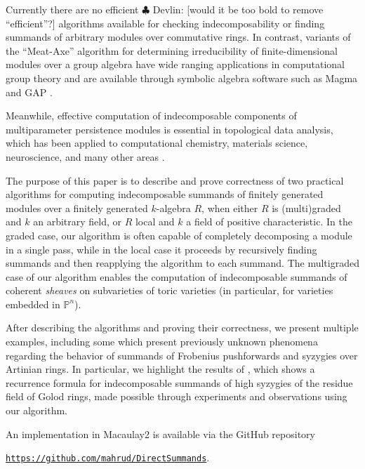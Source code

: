 \documentclass[12pt]{article}
\def\PP{\mathbb P}
\theoremstyle{theorem}
\numberwithin{thm}{section}
\theoremstyle{definition}
\newcommand{\devlin}[1]{{\color{red} \sf $\clubsuit$ Devlin: [#1]}}
\begin{document}
Currently there are no efficient \devlin{would it be too bold to remove ``efficient''?} algorithms available for checking indecomposability or finding summands of arbitrary modules over commutative rings. In contrast, variants of the ``Meat-Axe'' algorithm for determining irreducibility of finite-dimensional modules over a group algebra have wide ranging applications in computational group theory \cite{Parker84,HR94,Holt98} and are available through symbolic algebra software such as Magma and GAP \cite{MAGMA,GAP}.

Meanwhile, effective computation of indecomposable components of multiparameter persistence modules is essential in topological data analysis, which has been applied to computational chemistry, materials science, neuroscience, and many other areas \cite{BL23}.

The purpose of this paper is to describe and prove correctness of two practical algorithms for computing indecomposable summands of finitely generated modules over a finitely generated $k$-algebra $R$, when either $R$ is (multi)graded and $k$ an arbitrary field, or $R$ local and $k$ a field of positive characteristic.
In the graded case, our algorithm is often capable of completely decomposing a module in a single pass, while in the local case it proceeds by recursively finding summands and then reapplying the algorithm to each summand.
The multigraded case of our algorithm enables the computation of indecomposable summands of coherent \emph{sheaves} on subvarieties of toric varieties (in particular, for varieties embedded in $\PP^n$).

After describing the algorithms and proving their correctness, we present multiple examples, including some which present previously unknown phenomena regarding the behavior of summands of Frobenius pushforwards and syzygies over Artinian rings. In particular, we highlight the results of \cite{CDE24}, which shows a recurrence formula for indecomposable summands of high syzygies of the residue field of Golod rings, made possible through experiments and observations using our algorithm.

An implementation in Macaulay2 \cite{M2} is available via the GitHub repository \\
\centerline{
  \href{https://github.com/mahrud/DirectSummands}
       {\texttt{https://github.com/mahrud/DirectSummands}}.}

\end{document}
